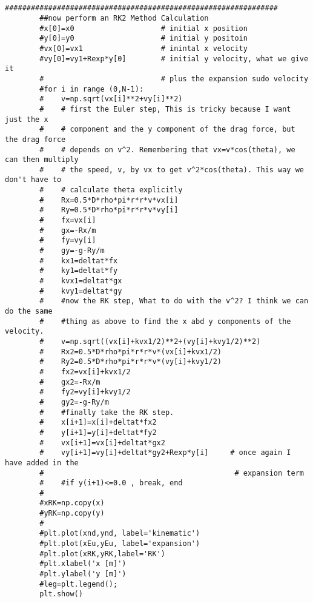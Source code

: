 \begin{small}
\begin{verbatim}
		
		###############################################################
		##now perform an RK2 Method Calculation
		#x[0]=x0                    # initial x position
		#y[0]=y0                    # initial y positoin
		#vx[0]=vx1                  # inintal x velocity
		#vy[0]=vy1+Rexp*y[0]        # initial y velocity, what we give it
		#                           # plus the expansion sudo velocity
		#for i in range (0,N-1):
		#    v=np.sqrt(vx[i]**2+vy[i]**2)
		#    # first the Euler step, This is tricky because I want just the x
		#    # component and the y component of the drag force, but the drag force
		#    # depends on v^2. Remembering that vx=v*cos(theta), we can then multiply
		#    # the speed, v, by vx to get v^2*cos(theta). This way we don't have to
		#    # calculate theta explicitly
		#    Rx=0.5*D*rho*pi*r*r*v*vx[i]
		#    Ry=0.5*D*rho*pi*r*r*v*vy[i]
		#    fx=vx[i]
		#    gx=-Rx/m
		#    fy=vy[i]
		#    gy=-g-Ry/m
		#    kx1=deltat*fx
		#    ky1=deltat*fy
		#    kvx1=deltat*gx
		#    kvy1=deltat*gy
		#    #now the RK step, What to do with the v^2? I think we can do the same
		#    #thing as above to find the x abd y components of the velocity.
		#    v=np.sqrt((vx[i]+kvx1/2)**2+(vy[i]+kvy1/2)**2)
		#    Rx2=0.5*D*rho*pi*r*r*v*(vx[i]+kvx1/2)
		#    Ry2=0.5*D*rho*pi*r*r*v*(vy[i]+kvy1/2)
		#    fx2=vx[i]+kvx1/2
		#    gx2=-Rx/m
		#    fy2=vy[i]+kvy1/2
		#    gy2=-g-Ry/m
		#    #finally take the RK step.
		#    x[i+1]=x[i]+deltat*fx2
		#    y[i+1]=y[i]+deltat*fy2
		#    vx[i+1]=vx[i]+deltat*gx2
		#    vy[i+1]=vy[i]+deltat*gy2+Rexp*y[i]     # once again I have added in the 
		#                                            # expansion term
		#    #if y(i+1)<=0.0 , break, end
		#    
		#xRK=np.copy(x)
		#yRK=np.copy(y)
		#
		#plt.plot(xnd,ynd, label='kinematic')
		#plt.plot(xEu,yEu, label='expansion')
		#plt.plot(xRK,yRK,label='RK')
		#plt.xlabel('x [m]')
		#plt.ylabel('y [m]')
		#leg=plt.legend();
		plt.show()

	
	\end{verbatim}
\endgroup
	
\end{small}


